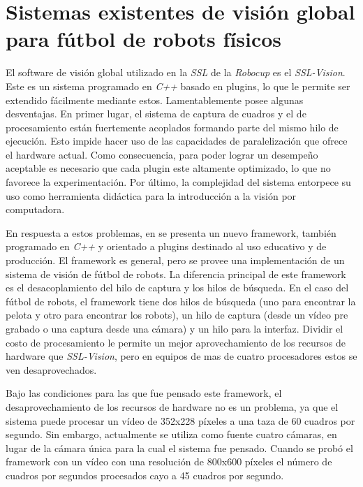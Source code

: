 
\section{Sistemas existentes de visión global para fútbol de robots físicos}


El software de visión global utilizado en la \emph{SSL} de la \emph{Robocup} es
el \emph{SSL-Vision}\cite{sslvision}. Este es un sistema programado en
\emph{C++} basado en plugins, lo que le permite ser extendido fácilmente
mediante estos. Lamentablemente posee algunas desventajas. En primer lugar, el
sistema de captura de cuadros y el de procesamiento están fuertemente
acoplados formando parte del mismo hilo de ejecución. Esto impide hacer uso de
las capacidades de paralelización que ofrece el hardware actual. Como
consecuencia, para poder lograr un desempeño aceptable es necesario que cada
plugin este altamente optimizado, lo que no favorece la experimentación. Por
último, la complejidad del sistema entorpece su uso como herramienta didáctica
para la introducción a la visión por computadora.

En respuesta a estos problemas, en \cite{torres2012, torres2014} se presenta un
nuevo framework, también programado en \emph{C++} y orientado a plugins
destinado al uso educativo y de producción. El framework es general, pero se
provee una implementación de un sistema de visión de fútbol de robots.  La
diferencia principal de este framework es el desacoplamiento del hilo de captura
y los hilos de búsqueda. En el caso del fútbol de robots, el framework tiene dos
hilos de búsqueda (uno para encontrar la pelota y otro para encontrar los
robots), un hilo de captura (desde un vídeo pre grabado o una captura desde una
cámara) y un hilo para la interfaz. Dividir el costo de procesamiento le permite
un mejor aprovechamiento de los recursos de hardware que \emph{SSL-Vision}, pero
en equipos de mas de cuatro procesadores estos se ven desaprovechados.

Bajo las condiciones para las que fue pensado este framework, el
desaprovechamiento de los recursos de hardware no es un problema, ya que el
sistema puede procesar un vídeo de 352x228 píxeles a una taza de 60 cuadros por
segundo. Sin embargo, actualmente se utiliza como fuente cuatro cámaras, en
lugar de la cámara única para la cual el sistema fue pensado. Cuando se probó el
framework con un vídeo con una resolución de 800x600 píxeles el número de
cuadros por segundos procesados cayo a 45 cuadros por segundo.
